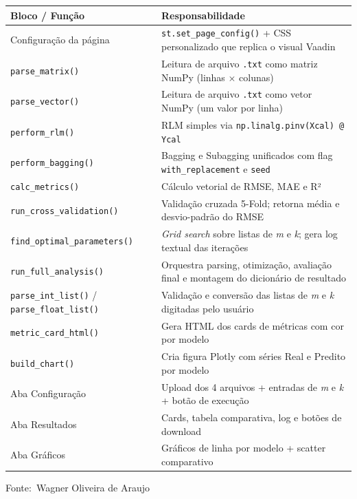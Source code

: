 \documentclass[12pt,a4paper]{article}
\newcommand{\oautor}{Wagner Oliveira de Araujo}
\begin{document}
\begin{quadro}[ht]
\centering
\small
\caption{Estrutura funcional do app.py}
\label{quadro:estrutura}
\begin{threeparttable}
\begin{tabularx}{\textwidth}{|l|X|} \hline
\textbf{Bloco / Função} & \textbf{Responsabilidade} \\ \hline
Configuração da página & \texttt{st.set\_page\_config()} + CSS personalizado que replica o visual Vaadin \\ \hline
\texttt{parse\_matrix()} & Leitura de arquivo \texttt{.txt} como matriz NumPy (linhas $\times$ colunas) \\ \hline
\texttt{parse\_vector()} & Leitura de arquivo \texttt{.txt} como vetor NumPy (um valor por linha) \\ \hline
\texttt{perform\_rlm()} & RLM simples via \texttt{np.linalg.pinv(Xcal) @ Ycal} \\ \hline
\texttt{perform\_bagging()} & Bagging e Subagging unificados com flag \texttt{with\_replacement} e \texttt{seed} \\ \hline
\texttt{calc\_metrics()} & Cálculo vetorial de RMSE, MAE e R² \\ \hline
\texttt{run\_cross\_validation()} & Validação cruzada 5-Fold; retorna média e desvio-padrão do RMSE \\ \hline
\texttt{find\_optimal\_parameters()} & \textit{Grid search} sobre listas de \textit{m} e \textit{k}; gera log textual das iterações \\ \hline
\texttt{run\_full\_analysis()} & Orquestra parsing, otimização, avaliação final e montagem do dicionário de resultado \\ \hline
\texttt{parse\_int\_list()} / \texttt{parse\_float\_list()} & Validação e conversão das listas de \textit{m} e \textit{k} digitadas pelo usuário \\ \hline
\texttt{metric\_card\_html()} & Gera HTML dos cards de métricas com cor por modelo \\ \hline
\texttt{build\_chart()} & Cria figura Plotly com séries Real e Predito por modelo \\ \hline
Aba Configuração & Upload dos 4 arquivos + entradas de \textit{m} e \textit{k} + botão de execução \\ \hline
Aba Resultados & Cards, tabela comparativa, log e botões de download \\ \hline
Aba Gráficos & Gráficos de linha por modelo + scatter comparativo \\ \hline
\end{tabularx}
\begin{tablenotes}[flushleft]
\footnotesize
\item Fonte:~\oautor
\end{tablenotes}
\end{threeparttable}
\end{quadro}
\end{document}
